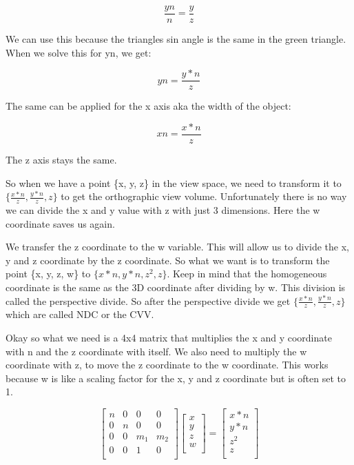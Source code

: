 \documentclass[12pt]{report} \usepackage{preamble}
\begin{document}
\[
	\frac{yn}{n} = \frac{y}{z}
\]

We can use this because the triangles sin angle is the same in the green triangle.
When we solve this for yn, we get:

\[
	yn = \frac{y * n}{z}
\]

The same can be applied for the x axis aka the width of the object:

\[
	xn = \frac{x * n}{z}
\]

The z axis stays the same.

So when we have a point \{x, y, z\} in the view space, we need to transform it to \\
\(\{\frac{x * n}{z}, \frac{y * n}{z}, z\}\) to get the orthographic view volume. Unfortunately
there is no way we can divide the x and y value with z with just 3 dimensions.
Here the w coordinate saves us again.

We transfer the z coordinate to the w variable.
This will allow us to divide the x, y and z coordinate by the z coordinate.
So what we want is to transform the point \{x, y, z, w\} to \(\{x * n, y * n, z^2, z\}\).
Keep in mind that the homogeneous coordinate is the same as the 3D coordinate after dividing by w.
This division is called the perspective divide.
So after the perspective divide we get \(\{\frac{x * n}{z}, \frac{y * n}{z}, z\}\) which are
called \ac{NDC} or the \ac{CVV}.

Okay so what we need is a 4x4 matrix that multiplies the x and y coordinate with n and the z coordinate
with itself. We also need to multiply the w coordinate with z,
to move the z coordinate to the w coordinate. This works because
w is like a scaling factor for the x, y and z coordinate but is often set to 1.

\[
	\begin{bmatrix}
		n & 0 & 0   & 0   \\
		0 & n & 0   & 0   \\
		0 & 0 & m_1 & m_2 \\
		0 & 0 & 1   & 0   \\
	\end{bmatrix}
	\begin{bmatrix}
		x \\
		y \\
		z \\
		w \\
	\end{bmatrix}
	=
	\begin{bmatrix}
		x * n \\
		y * n \\
		z^2   \\
		z     \\
	\end{bmatrix}
\]
\end{document}
